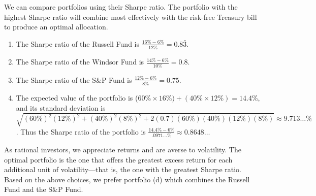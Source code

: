 \documentclass[12pt]{article}
\begin{document}
\section{}
We can compare portfolios using their Sharpe ratio. The portfolio with the highest Sharpe ratio will combine most effectively with the risk-free Treasury bill to produce an optimal allocation.

\begin{enumerate}
    \item The Sharpe ratio of the Russell Fund is $\frac{16\%-6\%}{12\%}=0.8\bar{3}.$
    \item The Sharpe ratio of the Windsor Fund is $\frac{14\%-6\%}{10\%}=0.8.$
    \item The Sharpe ratio of the S\&P Fund is $\frac{12\%-6\%}{8\%}=0.75.$
    \item The expected value of the portfolio is ($60\%\times 16\%)+(40\%\times 12\%)=14.4\%$, and its standard deviation is $\sqrt{(60\%)^2(12\%)^2+(40\%)^2(8\%)^2+2(0.7)(60\%)(40\%)(12\%)(8\%)}\approx 9.713\dots\%$. Thus the Sharpe ratio of the portfolio is $\frac{14.4\%-6\%}{.0971\dots\%}\approx 0.8648\dots$
\end{enumerate}
As rational investors, we appreciate returns and are averse to volatility. The optimal portfolio is the one that offers the greatest excess return for each additional unit of volatility---that is, the one with the greatest Sharpe ratio. Based on the above choices, we prefer portfolio (d) which combines the Russell Fund and the S\&P Fund.
\end{document}
